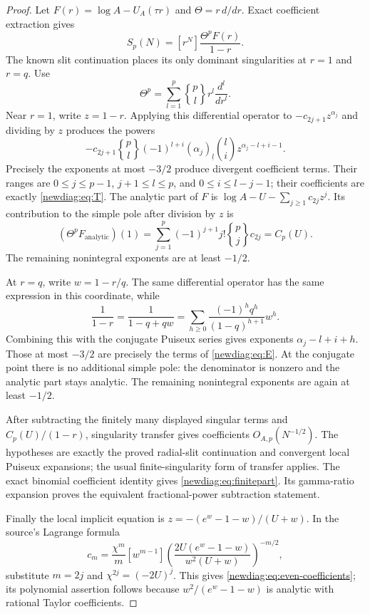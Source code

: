 \begin{proof}
Let $F(r)=\log A-U_A(\tau r)$ and
$\Theta=r\,d/dr$.  Exact coefficient extraction gives
\begin{equation}\label{newdiag:eq:partialsumgf}
 S_p(N)=[r^N]\frac{\Theta^pF(r)}{1-r}.
\end{equation}
The known slit continuation places its only dominant singularities
at $r=1$ and $r=q$.  Use
\[
 \Theta^p=\sum_{l=1}^p\genfrac{\{}{\}}{0pt}{}{p}{l}
                      r^l\frac{d^l}{dr^l}.
\]
Near $r=1$, write $z=1-r$.  Applying this differential operator to
$-c_{2j+1}z^{\alpha_j}$ and dividing by $z$ produces the powers
\[
 -c_{2j+1}\genfrac{\{}{\}}{0pt}{}{p}{l}
 (-1)^{l+i}(\alpha_j)_{\underline l}\binom li
 z^{\alpha_j-l+i-1}.
\]
Precisely the exponents at most $-3/2$ produce divergent
coefficient terms.  Their ranges are $0\leq j\leq p-1$,
$j+1\leq l\leq p$, and $0\leq i\leq l-j-1$; their coefficients
are exactly \eqref{newdiag:eq:T}.  The analytic part of $F$ is
$\log A-U-\sum_{j\geq1}c_{2j}z^j$.  Its contribution to the
simple pole after division by $z$ is
\[
 (\Theta^p F_{\mathrm{analytic}})(1)
   =\sum_{j=1}^p(-1)^{j+1}j!
                  \genfrac{\{}{\}}{0pt}{}{p}{j}c_{2j}=C_p(U).
\]
The remaining nonintegral exponents are at least $-1/2$.

At $r=q$, write $w=1-r/q$.  The same differential operator has
the same expression in this coordinate, while
\[
 \frac1{1-r}=\frac1{1-q+qw}
   =\sum_{h\geq0}\frac{(-1)^hq^h}{(1-q)^{h+1}}w^h.
\]
Combining this with the conjugate Puiseux series gives exponents
$\alpha_j-l+i+h$.  Those at most $-3/2$ are precisely the terms
of \eqref{newdiag:eq:E}.  At the conjugate point there is no
additional simple pole: the denominator is nonzero and the
analytic part stays analytic.  The remaining nonintegral exponents
are again at least $-1/2$.

After subtracting the finitely many displayed singular terms and
$C_p(U)/(1-r)$, singularity transfer \cite{FlajoletOdlyzko} gives coefficients
$O_{A,p}(N^{-1/2})$.  The hypotheses are exactly the proved radial-slit
continuation and convergent local Puiseux expansions; the usual
finite-singularity form of transfer applies.  The exact binomial
coefficient identity gives \eqref{newdiag:eq:finitepart}.  Its
gamma-ratio expansion proves the equivalent fractional-power
subtraction statement.

Finally the local implicit equation is
$z=-(e^w-1-w)/(U+w)$.  In the source's Lagrange formula
\[
 c_m=\frac{\chi^m}{m}[w^{m-1}]
 \left(\frac{2U(e^w-1-w)}{w^2(U+w)}\right)^{-m/2},
\]
substitute $m=2j$ and $\chi^{2j}=(-2U)^j$.  This gives
\eqref{newdiag:eq:even-coefficients}; its polynomial assertion follows
because $w^2/(e^w-1-w)$ is analytic with rational Taylor coefficients.
\end{proof}

